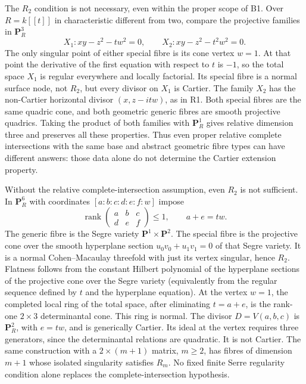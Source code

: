The $R_2$ condition is not necessary, even within the proper scope of B1.
Over $R=k[[t]]$ in characteristic different from two, compare the projective
families in $\mathbf P^3_R$
\[
 X_1: xy-z^2-tw^2=0,\qquad X_2: xy-z^2-t^2w^2=0.
\]
The only singular point of either special fibre is its cone vertex $w=1$.
At that point the derivative of the first equation with respect to $t$ is
$-1$, so the total space $X_1$ is regular everywhere and locally factorial.
Its special fibre is a normal surface node, not $R_2$, but every divisor on
$X_1$ is Cartier. The family $X_2$ has the non-Cartier horizontal divisor
$(x,z-itw)$, as in R1. Both special fibres are the same quadric cone, and
both geometric generic fibres are smooth projective quadrics. Taking the
product of both families with $\mathbf P^1_R$ gives relative dimension three
and preserves all these properties. Thus even proper relative complete
intersections with the same base and abstract geometric fibre types can
have different answers: those data alone do not determine the Cartier
extension property.

Without the relative complete-intersection assumption, even $R_2$ is not
sufficient. In $\mathbf P^6_R$ with coordinates $[a:b:c:d:e:f:w]$ impose
\[
 \operatorname{rank}\begin{pmatrix}a&b&c\\d&e&f\end{pmatrix}\leq1,
 \qquad a+e=tw.
\]
The generic fibre is the Segre variety $\mathbf P^1\times\mathbf P^2$.
The special fibre is the projective cone over the smooth hyperplane section
$u_0v_0+u_1v_1=0$ of that Segre variety. It is a normal Cohen--Macaulay
threefold with just its vertex singular, hence $R_2$. Flatness follows from
the constant Hilbert polynomial of the hyperplane sections of the projective
cone over the Segre variety (equivalently from the regular sequence defined
by $t$ and the hyperplane equation). At the vertex $w=1$, the completed local
ring of the total space, after eliminating $t=a+e$, is the rank-one
$2\times3$ determinantal cone. This ring is normal. The divisor
$D=V(a,b,c)$ is $\mathbf P^2_R$, with $e=tw$, and is generically Cartier.
Its ideal at the vertex requires three generators, since the determinantal
relations are quadratic. It is not Cartier. The same construction with a
$2\times(m+1)$ matrix, $m\geq2$, has fibres of dimension $m+1$ whose isolated
singularity satisfies $R_m$. No fixed finite Serre regularity condition alone
replaces the complete-intersection hypothesis.

